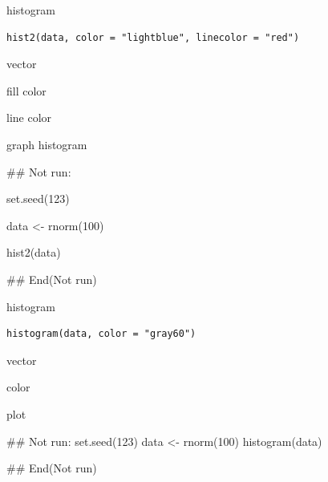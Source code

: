 \documentclass[a4paper]{book}
\begin{document}
%
\begin{Description}
histogram
\end{Description}
%
\begin{Usage}
\begin{verbatim}
hist2(data, color = "lightblue", linecolor = "red")
\end{verbatim}
\end{Usage}
%
\begin{Arguments}
\begin{ldescription}
\item[\code{data}] vector

\item[\code{color}] fill color

\item[\code{linecolor}] line color
\end{ldescription}
\end{Arguments}
%
\begin{Value}
graph histogram
\end{Value}
%
\begin{Examples}
\begin{ExampleCode}
 ## Not run: 

set.seed(123)

data <- rnorm(100)

hist2(data)

 
## End(Not run)

\end{ExampleCode}
\end{Examples}
%
\begin{Description}
histogram
\end{Description}
%
\begin{Usage}
\begin{verbatim}
histogram(data, color = "gray60")
\end{verbatim}
\end{Usage}
%
\begin{Arguments}
\begin{ldescription}
\item[\code{data}] vector

\item[\code{color}] color
\end{ldescription}
\end{Arguments}
%
\begin{Value}
plot
\end{Value}
%
\begin{Examples}
\begin{ExampleCode}
## Not run: 
set.seed(123)
data <- rnorm(100)
histogram(data)


## End(Not run)

\end{ExampleCode}
\end{Examples}
\end{document}
